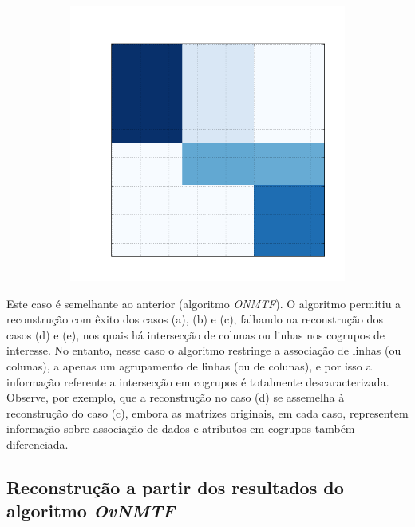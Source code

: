 \documentclass[
    12pt,                %
    oneside,            %
    a4paper,            %
    english,            %
    brazil                %
    ]{abntex2ppgsi}
\begin{document}
\begin{figure}[H]
\begin{subfigure}[b]{0.18\textwidth}
        \caption{}
    \end{subfigure}
    \begin{subfigure}[b]{0.18\textwidth}
        \includegraphics[width=\textwidth]{img/e-reconstruction-fnmtf.png}
    \caption{}
    \end{subfigure}
    \label{fig:reconstruction:fnmtf}
\end{figure}

Este caso é semelhante ao anterior (algoritmo \textit{ONMTF}). O algoritmo permitiu a reconstrução com êxito dos casos (a), (b) e (c), falhando na reconstrução dos casos (d) e (e), nos quais há intersecção de colunas ou linhas nos cogrupos de interesse. No entanto, nesse caso o algoritmo restringe a associação de linhas (ou colunas), a apenas um agrupamento de linhas (ou de colunas), e por isso a informação referente a intersecção em cogrupos é totalmente descaracterizada. Observe, por exemplo, que a reconstrução no caso (d) se assemelha à reconstrução do caso (c), embora as matrizes originais, em cada caso, representem informação sobre associação de dados e atributos em cogrupos também diferenciada.

\subsection{Reconstrução a partir dos resultados do algoritmo \textit{OvNMTF}}
\label{subsec:results-reconstruction-ovnmtf}
\end{document}
